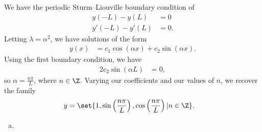 \documentclass[10pt]{mypackage}
\begin{document}
\begin{solution}[11.4, Problem 4]
  We have the periodic Sturm--Liouville boundary condition of
  \begin{align*}
    y\left(-L\right) - y\left(L\right) &= 0\\
    y'\left(-L\right) - y'\left(L\right) &= 0.
  \end{align*}
  Letting $\lambda = \alpha^2$, we have solutions of the form
  \begin{align*}
    y(x) &= c_1\cos\left( \alpha x \right) + c_2\sin\left( \alpha x \right).
  \end{align*}
  Using the first boundary condition, we have
  \begin{align*}
    2c_2\sin\left( \alpha L \right) &= 0,
  \end{align*}
  so $\alpha = \frac{n\pi}{L}$, where $n\in\Z$. Varying our coefficients and our values of $n$, we recover the family
  \begin{align*}
    y &= \set{1,\sin\left( \frac{n\pi}{L} \right),\cos\left( \frac{n\pi}{L} \right) | n\in\Z}.
  \end{align*}
\end{solution}
\begin{solution}[11.4, Problem 8]\hfill
  \begin{enumerate}[(a)]
    \item 
  \end{enumerate}
\end{solution}
\begin{solution}[11.4, Problem 10]

\end{solution}
\begin{solution}[12.3, Problem 2]

\end{solution}
\begin{solution}[12.3, Problem 4]

\end{solution}
\end{document}
